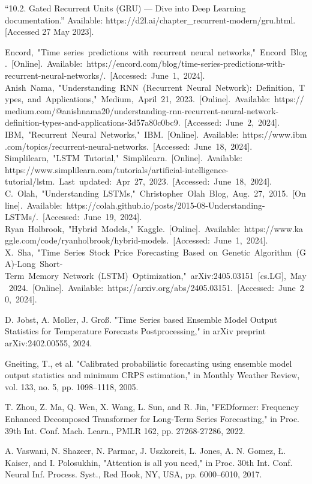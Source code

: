 \documentclass{ieeeojies}
\begin{document}
\begin{thebibliography}{00}
 “10.2. Gated Recurrent Units (GRU) — Dive into Deep Learning documentation.” Available:  https://d2l.ai/chapter\_recurrent-modern/gru.html. [Accessed 27 May 2023].

 Encord, "Time series predictions with recurrent neural networks," Encord Blog. [Online]. Available: https://encord.com/blog/time-series-predictions-with-recurrent-neural-networks/. [Accessed: June 1, 2024].
 Anish Nama, "Understanding RNN (Recurrent Neural Network): Definition, Types, and Applications," Medium, April 21, 2023. [Online]. Available: https://medium.com/@anishnama20/understanding-rnn-recurrent-neural-network-definition-types-and-applications-3d57a80c0bc9. [Accessed: June 2, 2024].
 IBM, "Recurrent Neural Networks," IBM. [Online]. Available: https://www.ibm.com/topics/recurrent-neural-networks. [Accessed: June 18, 2024].
 Simplilearn, "LSTM Tutorial," Simplilearn. [Online]. Available: https://www.simplilearn.com/tutorials/artificial-intelligence-tutorial/lstm. Last updated: Apr 27, 2023. [Accessed: June 18, 2024].
 C. Olah, "Understanding LSTMs," Christopher Olah Blog, Aug. 27, 2015. [Online]. Available: https://colah.github.io/posts/2015-08-Understanding-LSTMs/. [Accessed: June 19, 2024].
 Ryan Holbrook, "Hybrid Models," Kaggle. [Online]. Available: https://www.kaggle.com/code/ryanholbrook/hybrid-models. [Accessed: June 1, 2024].
 X. Sha, "Time Series Stock Price Forecasting Based on Genetic Algorithm (GA)-Long Short-Term Memory Network (LSTM) Optimization," arXiv:2405.03151 [cs.LG], May 2024. [Online]. Available: https://arxiv.org/abs/2405.03151. [Accessed: June 20, 2024].

D. Jobst, A. Moller, J. Groß. "Time Series based Ensemble Model Output Statistics for Temperature Forecasts Postprocessing," in arXiv preprint arXiv:2402.00555, 2024.

  Gneiting, T., et al. "Calibrated probabilistic forecasting using ensemble model output statistics and minimum CRPS estimation," in Monthly Weather Review, vol. 133, no. 5, pp. 1098–1118, 2005.

T. Zhou, Z. Ma, Q. Wen, X. Wang, L. Sun, and R. Jin, "FEDformer: Frequency Enhanced Decomposed Transformer for Long-Term Series Forecasting," in Proc. 39th Int. Conf. Mach. Learn., PMLR 162, pp. 27268-27286, 2022.

A. Vaswani, N. Shazeer, N. Parmar, J. Uszkoreit, L. Jones, A. N. Gomez, Ł. Kaiser, and I. Polosukhin, "Attention is all you need," in Proc. 30th Int. Conf. Neural Inf. Process. Syst., Red Hook, NY, USA, pp. 6000–6010, 2017.


\end{thebibliography}


\EOD
\end{document}
